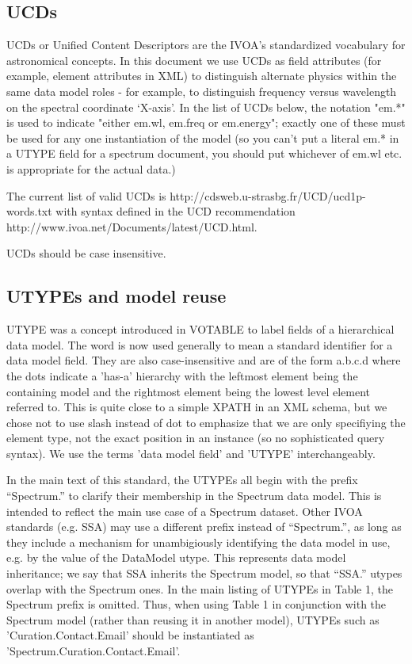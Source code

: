 \documentclass[11pt]{article}
\begin{document}
\subsection{UCDs}

UCDs or Unified Content Descriptors are the IVOA's standardized vocabulary
for astronomical concepts. In this document we use UCDs as field attributes
(for example, element attributes in XML) to distinguish alternate 
physics within the same data model roles - for example, to distinguish
frequency versus wavelength on the spectral coordinate `X-axis'.
In the list of UCDs below, the notation "em.*" is used to indicate "either
em.wl, em.freq or em.energy"; exactly one of these must be used for
any one instantiation of the model (so you can't put a literal em.* in
a UTYPE field for a spectrum document, you should put whichever of
em.wl etc. is appropriate for the actual data.)

The current list of valid UCDs is
http://cdsweb.u-strasbg.fr/UCD/ucd1p-words.txt
with syntax defined in the UCD recommendation
http://www.ivoa.net/Documents/latest/UCD.html.

UCDs should be case insensitive.


\subsection{UTYPEs and model reuse}

UTYPE was a concept introduced in VOTABLE to label fields of a hierarchical
data model. The word is now used generally to mean a standard identifier
for a data model field. They are also case-insensitive and are of the
form a.b.c.d  where the dots indicate a 'has-a' hierarchy
with the leftmost element being the containing model and the rightmost
element being the lowest level element referred to. This is quite close
to a simple XPATH in an XML schema, but we chose not to use slash instead of
dot to emphasize that we are only specifiying the element type, not the
exact position in an instance (so no sophisticated query syntax).
We use the terms 'data model field' and 'UTYPE' interchangeably.

In the main text of this standard, the UTYPEs all begin with the prefix ``Spectrum.'' to
clarify their membership in the Spectrum data model. This
is intended to reflect the main use case of a Spectrum dataset. Other IVOA standards
(e.g. SSA) may use a different prefix instead of ``Spectrum.'', as long as they
include a mechanism for unambigiously identifying the data model in use,
e.g. by the value of the DataModel utype. This represents data model inheritance;
we say that SSA inherits the Spectrum model, so that ``SSA.'' utypes overlap
with the Spectrum ones. In the main listing of UTYPEs in Table 1, the Spectrum prefix is omitted.
Thus, when using Table 1 in conjunction with the Spectrum model (rather than reusing it in another
model), UTYPEs such as  'Curation.Contact.Email' should be instantiated as 'Spectrum.Curation.Contact.Email'.
\end{document}
